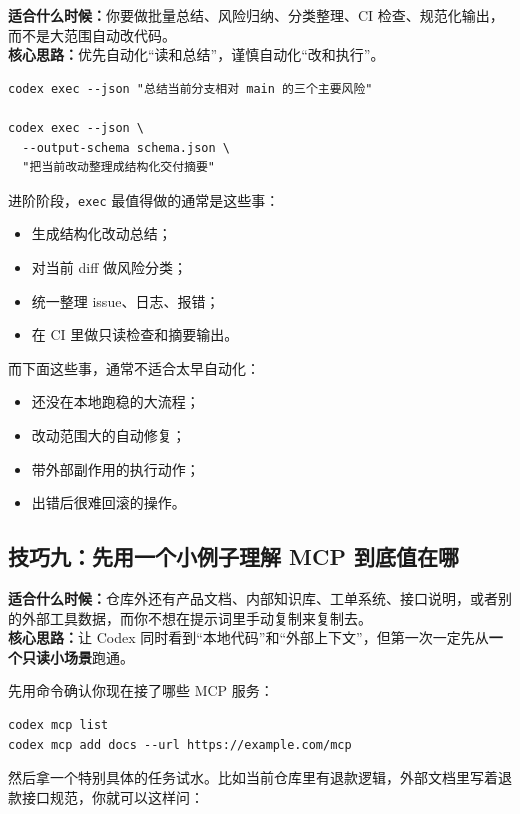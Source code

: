 \documentclass[UTF8,a4paper,12pt]{ctexart}
\begin{document}
\textbf{适合什么时候：}你要做批量总结、风险归纳、分类整理、CI 检查、规范化输出，而不是大范围自动改代码。\\
\textbf{核心思路：}优先自动化“读和总结”，谨慎自动化“改和执行”。

\begin{lstlisting}[style=cli]
codex exec --json "总结当前分支相对 main 的三个主要风险"

codex exec --json \
  --output-schema schema.json \
  "把当前改动整理成结构化交付摘要"
\end{lstlisting}

进阶阶段，\texttt{exec} 最值得做的通常是这些事：
\begin{itemize}
  \item 生成结构化改动总结；
  \item 对当前 diff 做风险分类；
  \item 统一整理 issue、日志、报错；
  \item 在 CI 里做只读检查和摘要输出。
\end{itemize}

而下面这些事，通常不适合太早自动化：
\begin{itemize}
  \item 还没在本地跑稳的大流程；
  \item 改动范围大的自动修复；
  \item 带外部副作用的执行动作；
  \item 出错后很难回滚的操作。
\end{itemize}

\subsection{技巧九：先用一个小例子理解 MCP 到底值在哪}

\textbf{适合什么时候：}仓库外还有产品文档、内部知识库、工单系统、接口说明，或者别的外部工具数据，而你不想在提示词里手动复制来复制去。\\
\textbf{核心思路：}让 Codex 同时看到“本地代码”和“外部上下文”，但第一次一定先从\textbf{一个只读小场景}跑通。

先用命令确认你现在接了哪些 MCP 服务：

\begin{lstlisting}[style=cli]
codex mcp list
codex mcp add docs --url https://example.com/mcp
\end{lstlisting}

然后拿一个特别具体的任务试水。比如当前仓库里有退款逻辑，外部文档里写着退款接口规范，你就可以这样问：
\end{document}
